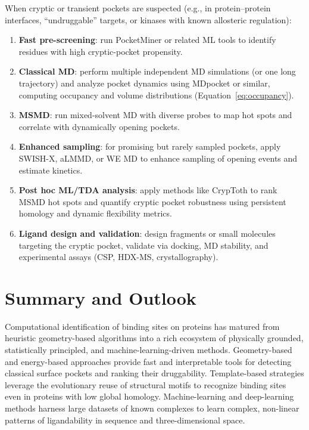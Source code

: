 \documentclass[12pt,a4paper]{article}
\begin{document}
When cryptic or transient pockets are suspected (e.g., in protein--protein interfaces, ``undruggable'' targets, or kinases with known allosteric regulation):
\begin{enumerate}
    \item \textbf{Fast pre-screening}: run PocketMiner or related ML tools to identify residues with high cryptic-pocket propensity.\cite{CH5_meller2023predicting,CH5_Gasparikova2025}
    \item \textbf{Classical MD}: perform multiple independent MD simulations (or one long trajectory) and analyze pocket dynamics using MDpocket or similar, computing occupancy and volume distributions (Equation~\ref{eq:occupancy}).\cite{CH5_Kuzmanic2020}
    \item \textbf{MSMD}: run mixed-solvent MD with diverse probes to map hot spots and correlate with dynamically opening pockets.\cite{CH5_Kuzmanic2020,CH5_koseki2025cryptoth}
    \item \textbf{Enhanced sampling}: for promising but rarely sampled pockets, apply SWISH-X, aLMMD, or WE MD to enhance sampling of opening events and estimate kinetics.\cite{CH5_Ng2022aLMMD,CH5_Borsatto2024SWISHX,CH5_zhang2026decrypting}
    \item \textbf{Post hoc ML/TDA analysis}: apply methods like CrypToth to rank MSMD hot spots and quantify cryptic pocket robustness using persistent homology and dynamic flexibility metrics.\cite{CH5_koseki2025cryptoth}
    \item \textbf{Ligand design and validation}: design fragments or small molecules targeting the cryptic pocket, validate via docking, MD stability, and experimental assays (CSP, HDX-MS, crystallography).\cite{CH5_Kuzmanic2020,CH5_Gasparikova2025}
\end{enumerate}

\section{Summary and Outlook}

Computational identification of binding sites on proteins has matured from heuristic geometry-based algorithms into a rich ecosystem of physically grounded, statistically principled, and machine-learning-driven methods. Geometry-based and energy-based approaches provide fast and interpretable tools for detecting classical surface pockets and ranking their druggability. Template-based strategies leverage the evolutionary reuse of structural motifs to recognize binding sites even in proteins with low global homology. Machine-learning and deep-learning methods harness large datasets of known complexes to learn complex, non-linear patterns of ligandability in sequence and three-dimensional space.\cite{CH5_ghersi2011beyond,CH5_zhao2020exploring,CH5_mou2025deep}
\end{document}
